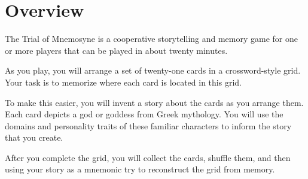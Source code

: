 \section*{Overview}

The Trial of Mnemosyne is a cooperative storytelling and memory game for one or more players that can be played in about twenty minutes.

As you play, you will arrange a set of twenty-one cards in a crossword-style grid.
Your task is to memorize where each card is located in this grid.

To make this easier, you will invent a story about the cards as you arrange them.
Each card depicts a god or goddess from Greek mythology.
You will use the domains and personality traits of these familiar characters to inform the story that you create.

After you complete the grid, you will collect the cards, shuffle them, and then \textemdash{} using your story as a mnemonic \textemdash{} try to reconstruct the grid from memory.

